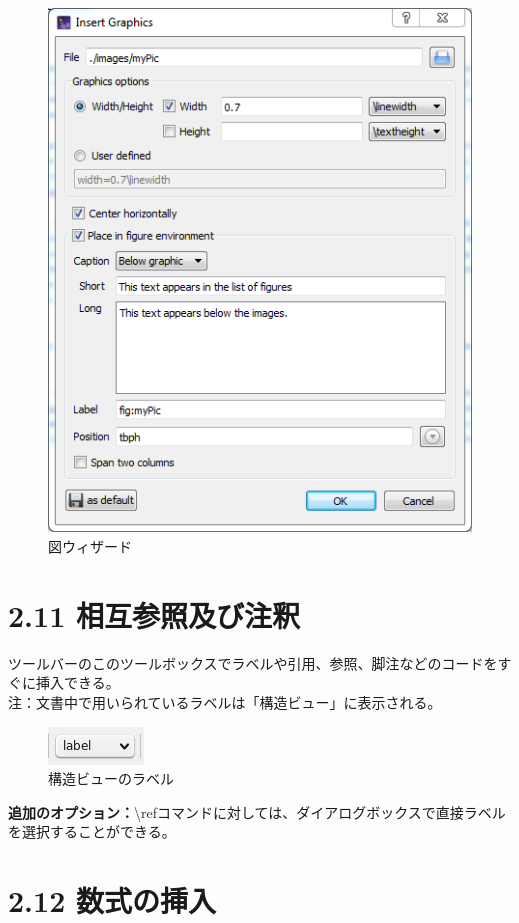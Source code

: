 \documentclass[]{book}
\makeatletter
\def\maxwidth{\ifdim\Gin@nat@width>\linewidth\linewidth
\else\Gin@nat@width\fi}
\let\Oldincludegraphics\includegraphics
\renewcommand{\includegraphics}[1]{\Oldincludegraphics[width=\maxwidth]{#1}}
\makeatother
\begin{document}
\begin{figure}[htbp]
\centering
\includegraphics{wizard_figure.png}
\caption{図ウィザード}
\end{figure}

\section{2.11 相互参照及び注釈}

ツールバーのこのツールボックスでラベルや引用、参照、脚注などのコードをすぐに挿入できる。\\
注：文書中で用いられているラベルは「構造ビュー」に表示される。

\begin{figure}[htbp]
\centering
\includegraphics{doc10.png}
\caption{構造ビューのラベル}
\end{figure}

\textbf{追加のオプション：}\textbackslash{}refコマンドに対しては、ダイアログボックスで直接ラベルを選択することができる。

\section{2.12 数式の挿入}
\end{document}
